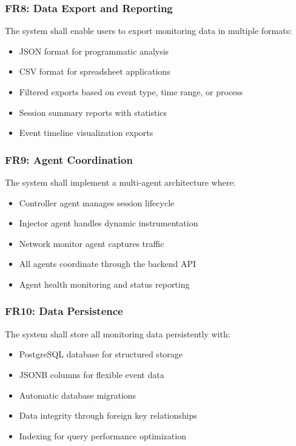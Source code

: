\subsubsection{FR8: Data Export and Reporting}

The system shall enable users to export monitoring data in multiple formats:
\begin{itemize}
    \item JSON format for programmatic analysis
    \item CSV format for spreadsheet applications
    \item Filtered exports based on event type, time range, or process
    \item Session summary reports with statistics
    \item Event timeline visualization exports
\end{itemize}

\subsubsection{FR9: Agent Coordination}

The system shall implement a multi-agent architecture where:
\begin{itemize}
    \item Controller agent manages session lifecycle
    \item Injector agent handles dynamic instrumentation
    \item Network monitor agent captures traffic
    \item All agents coordinate through the backend API
    \item Agent health monitoring and status reporting
\end{itemize}

\subsubsection{FR10: Data Persistence}

The system shall store all monitoring data persistently with:
\begin{itemize}
    \item PostgreSQL database for structured storage
    \item JSONB columns for flexible event data
    \item Automatic database migrations
    \item Data integrity through foreign key relationships
    \item Indexing for query performance optimization
\end{itemize}

